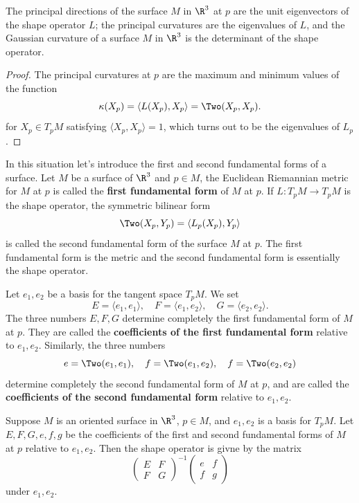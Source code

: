 \begin{corollary}
The principal directions of the surface $M$ in $\R^3$ at $p$ are the unit eigenvectors of the shape operator $L$; the principal curvatures are the eigenvalues of $L$, 
and the Gaussian curvature of a surface $M$ in $\R^3$ is the determinant of the shape operator.
\end{corollary}
\begin{proof}
The principal curvatures at $p$ are the maximum and minimum values of the function
\[\kappa(X_p)=\langle L(X_p),X_p\rangle=\Two(X_p,X_p).\]
for $X_p\in T_pM$ satisfying $\langle X_p,X_p\rangle=1$, which turns out to be the eigenvalues of $L_p$.
\end{proof}
In this situation let's introduce the first and second fundamental forms of a surface. Let $M$ be a surface of $\R^3$ and $p\in M$, the Euclidean Riemannian metric for 
$M$ at $p$ is called the \textbf{first fundamental form} of $M$ at $p$. If $L:T_pM\to T_pM$ is the shape operator, the symmetric bilinear form 
\[\Two(X_p,Y_p)=\langle L_p(X_p),Y_p\rangle\]
is called the second fundamental form of the surface $M$ at $p$. The first fundamental form is the metric and the second fundamental form is essentially the shape 
operator.\par
Let $e_1,e_2$ be a basis for the tangent space $T_pM$. We set
\[E=\langle e_1,e_1\rangle,\quad F=\langle e_1,e_2\rangle,\quad G=\langle e_2,e_2\rangle.\]
The three numbers $E,F,G$ determine completely the first fundamental form of $M$ at $p$. They are called the \textbf{coefficients of the first fundamental form} 
relative to $e_1,e_2$. Similarly, the three numbers
\[e=\Two(e_1,e_1),\quad f=\Two(e_1,e_2),\quad f=\Two(e_2,e_2)\]
determine completely the second fundamental form of $M$ at $p$, and are called the \textbf{coefficients of the second fundamental form} relative to $e_1,e_2$.
\begin{proposition}\label{Riemann shape operator fundamental forms}
Suppose $M$ is an oriented surface in $\R^3$, $p\in M$, and $e_1,e_2$ is a basis for $T_pM$. Let $E,F,G,e,f,g$ be the coefficients of the first and second fundamental 
forms of $M$ at $p$ relative to $e_1,e_2$. Then the shape operator is givne by the matrix
\[\begin{pmatrix}
E&F\\
F&G
\end{pmatrix}^{-1}\begin{pmatrix}
e&f\\
f&g
\end{pmatrix}\]
under $e_1,e_2$.
\end{proposition}

